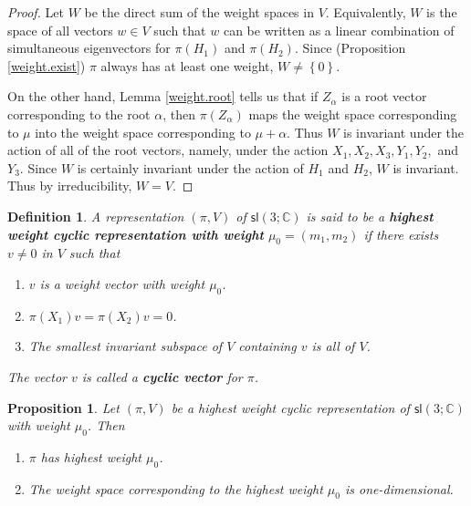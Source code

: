 \documentclass{amsbook}
\theoremstyle{plain}
\newtheorem{definition}[theorem]{Definition}
\newtheorem{proposition}[theorem]{Proposition}
\numberwithin{equation}{chapter}
\numberwithin{theorem}{chapter}
\begin{document}
\begin{proof}
Let $W$ be the direct sum of the weight spaces in $V$. Equivalently, $W$ is
the space of all vectors $w\in V$ such that $w$ can be written as a linear
combination of simultaneous eigenvectors for $\pi(H_{1})$ and $\pi(H_{2})$.
Since (Proposition \ref{weight.exist}) $\pi$ always has at least one weight,
$W\neq\left\{  0\right\}  $.

On the other hand, Lemma \ref{weight.root} tells us that if $Z_{\alpha}$ is a
root vector corresponding to the root $\alpha$, then $\pi(Z_{\alpha})$ maps
the weight space corresponding to $\mu$ into the weight space corresponding to
$\mu+\alpha$. Thus $W$ is invariant under the action of all of the root
vectors, namely, under the action $X_{1},X_{2},X_{3},Y_{1},Y_{2},$ and $Y_{3}%
$. Since $W$ is certainly invariant under the action of $H_{1}$ and $H_{2}$,
$W$ is invariant. Thus by irreducibility, $W=V$.
\end{proof}

\begin{definition}
A representation $\left(  \pi,V\right)  $ of $\mathsf{sl}\left(
3;\mathbb{C}\right)  $ is said to be a \textbf{highest weight cyclic
representation with weight }$\mu_{0}=(m_{1},m_{2})$ if there exists $v\neq0$
in $V$ such that

\begin{enumerate}
\item $v$ is a weight vector with weight $\mu_{0}$.

\item $\pi(X_{1})v=\pi(X_{2})v=0$.

\item  The smallest invariant subspace of $V$ containing $v$ is all of $V$.
\end{enumerate}

\noindent The vector $v$ is called a \textbf{cyclic vector} for $\pi$.
\end{definition}

\begin{proposition}
\label{highest.highest}Let $\left(  \pi,V\right)  $ be a highest weight cyclic
representation of $\mathsf{sl}\left(  3;\mathbb{C}\right)  $ with weight
$\mu_{0}$. Then

\begin{enumerate}
\item $\pi$ has highest weight $\mu_{0}$.

\item  The weight space corresponding to the highest weight $\mu_{0}$ is one-dimensional.
\end{enumerate}
\end{proposition}
\end{document}
